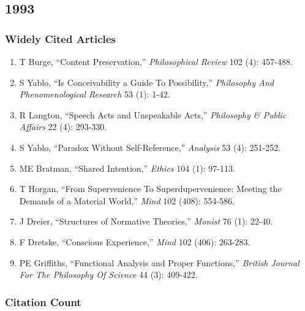 \documentclass[
  10pt,
  letterpaper,
  DIV=11,
  numbers=noendperiod,
  twoside]{scrartcl}
\providecommand{\tightlist}{%
  \setlength{\itemsep}{0pt}\setlength{\parskip}{0pt}}\usepackage{longtable,booktabs,array}
\begin{document}
\newpage

\subsection{1993}\label{sec-s1993}

\subsubsection*{Widely Cited Articles}\label{widely-cited-articles-17}

\begin{enumerate}
\def\labelenumi{\arabic{enumi}.}
\tightlist
\item
  T Burge, ``Content Preservation,'' \emph{Philosophical Review} 102
  (4): 457-488.
\item
  S Yablo, ``Is Conceivability a Guide To Possibility,''
  \emph{Philosophy And Phenomenological Research} 53 (1): 1-42.
\item
  R Langton, ``Speech Acts and Unspeakable Acts,'' \emph{Philosophy \&
  Public Affairs} 22 (4): 293-330.
\item
  S Yablo, ``Paradox Without Self-Reference,'' \emph{Analysis} 53 (4):
  251-252.
\item
  ME Bratman, ``Shared Intention,'' \emph{Ethics} 104 (1): 97-113.
\item
  T Horgan, ``From Supervenience To Superdupervenience: Meeting the
  Demands of a Material World,'' \emph{Mind} 102 (408): 554-586.
\item
  J Dreier, ``Structures of Normative Theories,'' \emph{Monist} 76 (1):
  22-40.
\item
  F Dretske, ``Conscious Experience,'' \emph{Mind} 102 (406): 263-283.
\item
  PE Griffiths, ``Functional Analysis and Proper Functions,''
  \emph{British Journal For The Philosophy Of Science} 44 (3): 409-422.
\end{enumerate}

\subsubsection*{Citation Count}\label{sec-count-1993}
\end{document}
